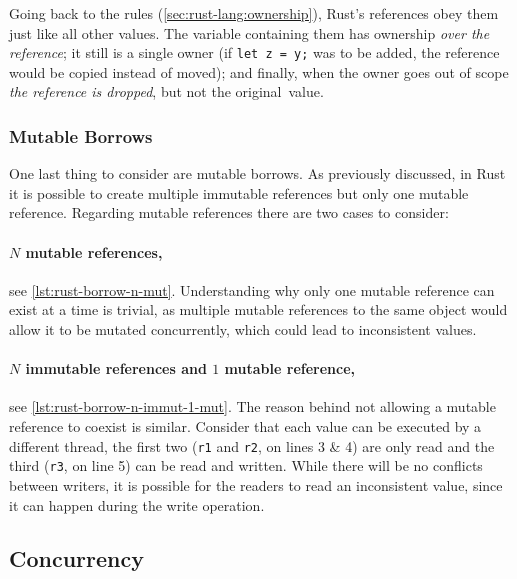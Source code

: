 Going back to the rules (\autoref{sec:rust-lang:ownership}), Rust's references obey them just like all other values.
The variable containing them has ownership \emph{over the reference}; it still is a single owner
(if \texttt{let z = y;} was to be added, the reference would be copied instead of moved);
and finally, when the owner goes out of scope \emph{the reference is dropped}, but not the original~value.



\subsubsection*{Mutable Borrows}

One last thing to consider are mutable borrows.
As previously discussed, in Rust it is possible to create multiple immutable references but only one mutable reference.
Regarding mutable references there are two cases to consider:

\paragraph{$N$ mutable references,} see \autoref{lst:rust-borrow-n-mut}.
Understanding why only one mutable reference can exist at a time is trivial,
as multiple mutable references to the same object would allow it to be mutated concurrently,
which could lead to inconsistent values.

\paragraph{$N$ immutable references and $1$ mutable reference,} see \autoref{lst:rust-borrow-n-immut-1-mut}.
The reason behind not allowing a mutable reference to coexist is similar.
Consider that each value can be executed by a different thread,
the first two (\texttt{r1} and \texttt{r2}, on lines 3 \& 4) are only read and the third (\texttt{r3}, on line 5) can be read and written.
While there will be no conflicts between writers, it is possible for the readers to read an inconsistent value,
since it can happen during the write operation.





\subsection{Concurrency}\label{sec:rust-lang:concurrency}

